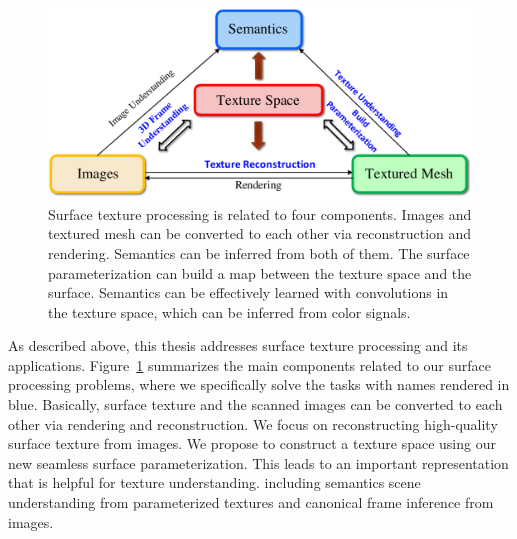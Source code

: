 \begin{figure}
    \centering
    \includegraphics[width=0.75\linewidth]{intro/concept.pdf}
    \caption{Surface texture processing is related to four components. Images and textured mesh can be converted to each other via reconstruction and rendering. Semantics can be inferred from both of them. The surface parameterization can build a map between the texture space and the surface. Semantics can be effectively learned with convolutions in the texture space, which can be inferred from color signals.}
    \label{fig:intro-concept}
\end{figure}

As described above, this thesis addresses surface texture processing and its applications. Figure~\ref{fig:intro-concept} summarizes the main components related to our surface processing problems, where we specifically solve the tasks with names rendered in blue. Basically, surface texture and the scanned images can be converted to each other via rendering and reconstruction. We focus on reconstructing high-quality surface texture from images. We propose to construct a texture space using our new seamless surface parameterization. This leads to an important representation that is helpful for texture understanding. including semantics scene understanding from parameterized textures and canonical frame inference from images.

